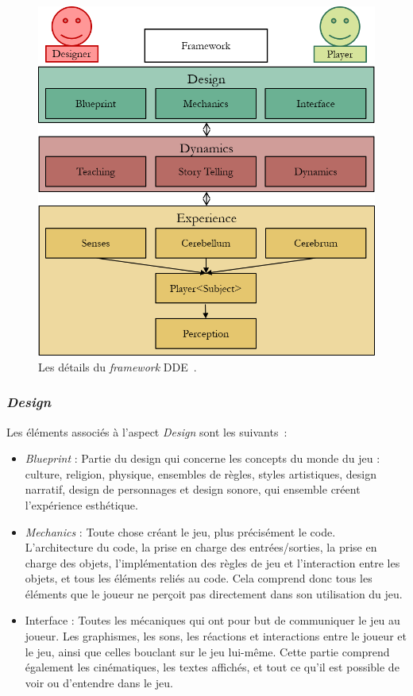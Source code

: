 \begin{figure}[H]
    \begin{center}
    \includegraphics[width=13cm]{10_img/chap3/dde_extended_modif.png} 
    \caption{Les d\'etails du \emph{framework} DDE~\cite{DDE}.}
    \label{fig.dde_extended}
    \end{center}
\end{figure}

\subsubsection{\emph{Design}}

Les \'el\'ements associ\'es \`a l'aspect \emph{Design} sont les suivants~: 
    \begin{itemize}
        \item \emph{Blueprint} : Partie du design qui concerne les concepts du monde du jeu : culture, religion, physique, ensembles de règles, styles artistiques, design narratif, design de personnages et design sonore, qui ensemble créent l'expérience esthétique.
        \item \emph{Mechanics} : Toute chose créant le jeu, plus précisément le code. L'architecture du code, la prise en charge des entrées/sorties, la prise en charge des objets, l'implémentation des règles de jeu et l'interaction entre les objets, et tous les éléments reliés au code. Cela comprend donc tous les éléments que le joueur ne perçoit pas directement dans son utilisation du jeu.
        \item Interface : Toutes les mécaniques qui ont pour but de communiquer le jeu au joueur. Les graphismes, les sons, les réactions et interactions entre le joueur et le jeu, ainsi que celles bouclant sur le jeu lui-même. Cette partie comprend également les cinématiques, les textes affichés, et tout ce qu'il est possible de voir ou d'entendre dans le jeu.
    \end{itemize}

